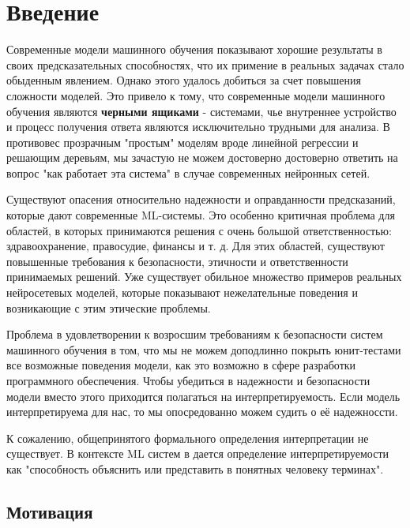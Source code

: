 \chapter{Введение}

Современные модели машинного обучения показывают хорошие результаты в своих предсказательных способностях, что их примение в реальных задачах стало обыденным явлением. Однако этого удалось добиться за счет повышения сложности моделей. Это привело к тому, что современные модели машинного обучения являются \textbf{черными ящиками} - системами, чье внутреннее устройство и процесс получения ответа являются исключительно трудными для анализа. В противовес прозрачным "простым" моделям вроде линейной регрессии и решающим деревьям, мы зачастую не можем достоверно достоверно ответить на вопрос "как работает эта система" в случае современных нейронных сетей.

Существуют опасения относительно надежности и оправданности предсказаний, которые дают современные ML-системы. Это особенно критичная проблема для областей, в которых принимаются решения с очень большой ответственностью: здравоохранение, правосудие, финансы и т. д.  Для этих областей, существуют повышенные требования к безопасности, этичности и ответственности принимаемых решений. Уже существует обильное множество примеров реальных нейросетевых моделей, которые показывают нежелательные поведения и возникающие с этим этические проблемы.

Проблема в удовлетворении к возросшим требованиям к безопасности систем машинного обучения в том, что мы не можем  доподлинно покрыть юнит-тестами все возможные поведения модели, как это возможно в сфере разработки программного обеспечения. Чтобы убедиться в надежности и безопасности модели вместо этого приходится полагаться на интерпретируемость. Если модель интерпретируема для нас, то мы опосредованно можем судить о её надежноссти.

К сожалению, общепринятого формального определения интерпретации не существует. В контексте ML систем в \cite{doshi-velezRigorousScienceInterpretable2017}  дается определение интерпретируемости как "способность объяснить или представить в понятных человеку терминах".


\section{Мотивация}

